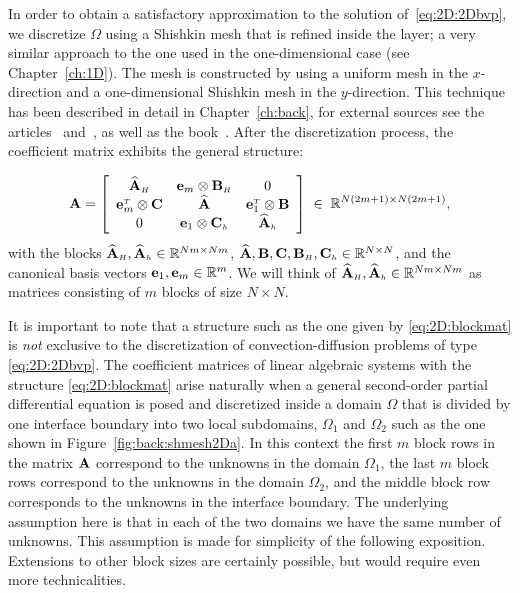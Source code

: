 In order to obtain a satisfactory approximation to the solution
of~\eqref{eq:2D:2Dbvp}, we discretize $\Omega$ using a Shishkin mesh that is
refined inside the layer; a very similar approach to the one used in the
one-dimensional case (see Chapter~\ref{ch:1D}). The mesh is constructed by
using a uniform mesh in the  $x$-direction and a one-dimensional Shishkin mesh
in the $y$-direction. This technique has been described in detail in
Chapter~\ref{ch:back}, for external  sources see the
articles~\cite[\S~5]{Sty05} and~\cite{KopOri10}, as well as the
book~\cite{MilOriShi96}.
%
%
After the discretization process, the coefficient matrix exhibits the general
structure:

\begin{equation}
\label{eq:2D:blockmat}
\mathbf{A}=\left[
  \begin{array}{ccc}
             \widehat{\mathbf{A}}_{\scriptscriptstyle H}       & \mathbf{e}_{m}\otimes\mathbf{B}_{\scriptscriptstyle H}   &    0            \\
    \mathbf{e}_{m}^{\scriptscriptstyle T}\otimes\mathbf{C}  &   \widehat{\mathbf{A}}      & \mathbf{e}_{1}^{\scriptscriptstyle T}\otimes\mathbf{B} \\
                   0         & \mathbf{e}_{1}\otimes\mathbf{C}_{\scriptscriptstyle h} &        \widehat{\mathbf{A}}_{\scriptscriptstyle h}  \\
  \end{array}
\right]\;\in\;{\mathbb R}^{N(2m+1)\times N(2m+1)},
\end{equation}
%
with the blocks $\widehat{\mathbf{A}}_{\scriptscriptstyle H}, \widehat{\mathbf{A}}_{\scriptscriptstyle h} \in \mathbb{R}^{Nm\times Nm}$,
$\widehat{\mathbf{A}}, \mathbf{B}, \mathbf{C}, \mathbf{B}_{\scriptscriptstyle H}, \mathbf{C}_{\scriptscriptstyle h} \in \mathbb{R}^{N\times N}$, and
the canonical basis vectors $\mathbf{e}_1,\mathbf{e}_m\in\mathbb{R}^{m}$. We will think of
$\widehat{\mathbf{A}}_{\scriptscriptstyle H}, \widehat{\mathbf{A}}_{\scriptscriptstyle h} \in \mathbb{R}^{Nm\times Nm}$ as matrices consisting of
$m$ blocks of size $N\times N$.

It is important to note that a structure such as the one given by
\eqref{eq:2D:blockmat} is \emph{not} exclusive to the discretization of
convection-diffusion problems of type \eqref{eq:2D:2Dbvp}. The coefficient
matrices of linear algebraic systems with the structure \eqref{eq:2D:blockmat}
arise naturally when a general second-order partial differential equation is
posed and discretized inside a domain $\Omega$ that is divided by one interface
boundary into two local subdomains, $\Omega_1$ and $\Omega_2$ such as the one
shown in Figure~\ref{fig:back:shmesh2Da}.
In this context the first $m$ block rows in the matrix $\mathbf{A}$ correspond
to the unknowns in the domain $\Omega_1$, the last $m$ block rows correspond to
the unknowns in the domain $\Omega_2$, and the middle block row corresponds to
the unknowns in the interface boundary. The underlying assumption here is that
in each of the two domains we have the same number of unknowns. This assumption
is made for simplicity of the following exposition. Extensions to other block
sizes are certainly possible, but would require even more technicalities.

